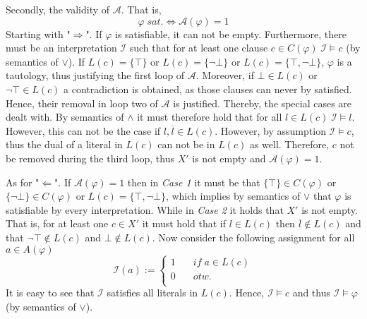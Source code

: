 \documentclass[11pt,a4paper]{article}
\begin{document}
Secondly, the validity of $\mathcal{A}$. That is, 
\begin{equation*}
\varphi \;\mathit{ sat.} \iff \mathcal{A}(\varphi)=1
\end{equation*}
Starting with "$\Rightarrow$". If $\varphi$ is satisfiable, it can not be empty. Furthermore, there must be an interpretation $\mathcal{I}$ such that for at least one clause $c \in C(\varphi) \; \mathcal{I}\models c$ (by semantics of $\lor$). If $L(c)=\{\top\}$ or $L(c)=\{\neg\bot\}$ or $L(c)=\{\top, \neg\bot\}$, $\varphi$ is a tautology, thus justifying the first loop of $\mathcal{A}$. Moreover, if $\bot \in L(c)$ or $\neg \top \in L(c)$ a contradiction is obtained, as those clauses can never by satisfied. Hence, their removal in loop two of $\mathcal{A}$ is justified. Thereby, the special cases are dealt with. By semantics of $\land$ it must therefore hold that for all $l \in L(c) \; \mathcal{I}\models l$. However, this can not be the case if $l,\overline{l} \in L(c)$. However, by assumption $\mathcal{I}\models c$, thus the dual of a literal in $L(c)$ can not be in $L(c)$ as well. Therefore, $c$ not be removed during the third loop, thus $X'$ is not empty and $\mathcal{A}(\varphi)=1$.


As for "$\Leftarrow$". If $\mathcal{A}(\varphi)=1$ then in \emph{Case 1} it must be that $\{\top\} \in C(\varphi)$ or $\{\neg\bot\} \in C(\varphi)$ or $L(c)=\{\top, \neg\bot\}$, which implies by semantics of $\lor$ that $\varphi$ is satisfiable by every interpretation. While in \emph{Case 2} it holds that $X'$ is not empty. That is, for at least one $c \in X'$ it must hold that if $l \in L(c)$ then $\overline{l} \notin L(c)$ and that $\neg\top \notin L(c)$ and $\bot \notin L(c)$. Now consider the following assignment for all $a \in A(\varphi)$
\begin{equation*}
\mathcal{I}(a):=
\begin{cases}
1 & \quad \mathit{if} \; a \in L(c) \\
0 & \quad otw.\\
\end{cases}
\end{equation*}
It is easy to see that $\mathcal{I}$ satisfies all literals in $L(c)$. Hence, $\mathcal{I} \models c$ and thus $\mathcal{I}\models \varphi$ (by semantics of $\lor$).
\end{document}
